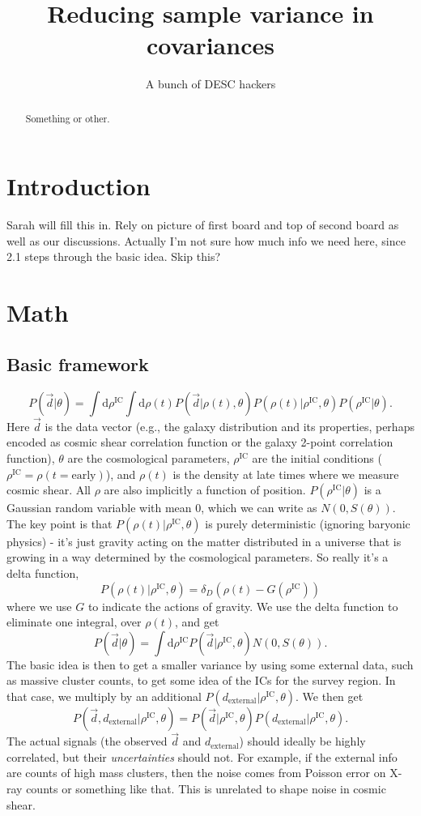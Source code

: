 \documentclass[preprint]{aastex}
\newcommand{\beq}{\begin{equation}}
\newcommand{\eeq}{\end{equation}}
\begin{document}
\title{Reducing sample variance in covariances}

\author{A bunch of DESC hackers}
\begin{abstract}
Something or other.
\end{abstract}

\section{Introduction}

Sarah will fill this in.  Rely on picture of first board and top of second board as well as our
discussions.  Actually I'm not sure how much info we need here, since 2.1 steps through the basic
idea.  Skip this?

\section{Math}

\subsection{Basic framework}
\beq
P(\vec{d}|\theta) = \int \mathrm{d}\rho^\text{IC}\int \mathrm{d}\rho(t) P(\vec{d}|\rho(t),\theta)
P(\rho(t)|\rho^\text{IC},\theta) P(\rho^\text{IC}|\theta).
\eeq
Here $\vec{d}$ is the data vector (e.g., the galaxy distribution and its properties, perhaps encoded
as cosmic shear correlation function or the galaxy 2-point
correlation function), $\theta$ are the cosmological parameters, $\rho^\text{IC}$ are the initial
conditions ($\rho^\text{IC}=\rho(t=\text{early})$), and $\rho(t)$ is the density at late times where we measure cosmic
shear.  All $\rho$ are also implicitly a function of position.
$P(\rho^\text{IC}|\theta)$ is a Gaussian random variable with mean $0$, which we can write as $N(0,S(\theta))$.  The key point is that
$P(\rho(t)|\rho^\text{IC},\theta)$ is purely deterministic (ignoring baryonic physics) - it's just
gravity acting on the matter distributed in a universe that is growing in a way determined by the
cosmological parameters.  So really it's a delta function,
\beq
P(\rho(t)|\rho^\text{IC},\theta) = \delta_D(\rho(t)-G(\rho^\text{IC}))
\eeq 
where we use $G$ to indicate the actions of gravity.  We use the delta function to eliminate one
integral, over $\rho(t)$, and get
\beq
P(\vec{d}|\theta) = \int \mathrm{d}\rho^\text{IC}  P(\vec{d}|\rho^\text{IC},\theta)N(0,S(\theta)).
\eeq
The basic idea is then to get a smaller variance by using some external data, such as massive
cluster counts, to get some idea of the ICs for the survey region.  In that case, we multiply by an
additional $P(d_\text{external}|\rho^\text{IC},\theta)$.  We then get
\beq
P(\vec{d},d_\text{external}|\rho^\text{IC},\theta) = P(\vec{d}|\rho^\text{IC},\theta)P(d_\text{external}|\rho^\text{IC},\theta).
\eeq
The actual signals (the observed $\vec{d}$ and $d_\text{external}$) should ideally be highly
correlated, but their {\em uncertainties} should not.  For example, if the external info are counts
of high mass clusters, then the noise comes from Poisson error on X-ray counts or something like
that.  This is unrelated to shape noise in cosmic shear.
\end{document}

